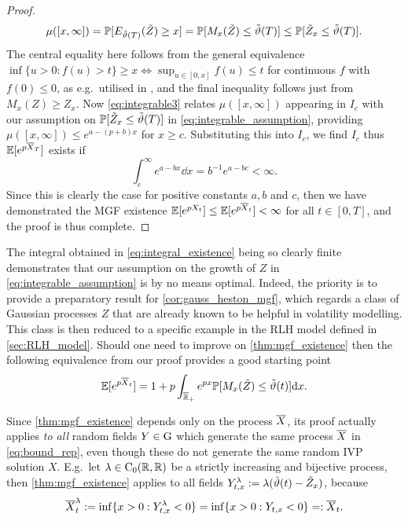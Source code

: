 \begin{proof}
    \begin{equation}\label{eq:integrable3}
        \mu([x,\infty]) = \mathbb{P}[ E_{\tilde{\vartheta}(T)}(\tilde{Z}) \ge x] = \mathbb{P}[M_x(\tilde{Z}) \le \tilde{\vartheta}(T)] \le \mathbb{P}[\tilde{Z}_x \le \tilde{\vartheta}(T)].
    \end{equation}
    The central equality here follows from the general equivalence $\inf\{u\!>\!0:f(u)\!>\!t\}\ge x\iff\sup_{u\in[0,x]}f(u)\le t$ for continuous $f$ with $f(0)\le0$, as e.g.~utilised in \cite{meerschaert_2004}, and the final inequality follows just from $M_x(Z)\ge Z_x$. Now \autoref{eq:integrable3} relates $\mu([x,\infty])$ appearing in $I_c$ with our assumption on $\mathbb{P}[\tilde{Z}_x \le \tilde{\vartheta}(T)]$ in \autoref{eq:integrable_assumption}, providing $\mu([x,\infty]) \le e^{a-(p+b)x}$ for $x\ge c$. Substituting this into $I_c$, we find $I_c$ thus $\mathbb{E}[e^{p{\overline{X}}_T}]$ exists if
    \begin{equation}\label{eq:integral_existence}
        \int_c^\infty e^{a - bx}\dd x = b^{-1}e^{a-bc} < \infty.
    \end{equation}
    Since this is clearly the case for positive constants $a,b$ and $c$, then we have demonstrated the MGF existence $\mathbb{E}[e^{p X_t}] \le \mathbb{E}[e^{p{\overline{X}}_t}]<\infty$ for all $t\in[0,T]$, and the proof is thus complete.
\end{proof}

The integral obtained in \autoref{eq:integral_existence} being so clearly finite demonstrates that our assumption on the growth of $Z$ in \autoref{eq:integrable_assumption} is by no means optimal. Indeed, the priority is to provide a preparatory result for \autoref{cor:gauss_heston_mgf}, which regards a class of Gaussian processes $Z$ that are already known to be helpful in volatility modelling. This class is then reduced to a specific example in the RLH model defined in \autoref{sec:RLH_model}. Should one need to improve on \autoref{thm:mgf_existence} then the following equivalence from our proof provides a good starting point
\begin{equation}
    \mathbb{E}[e^{p{\overline{X}}_t}] = 1 + p \int_{{\overline{\mathbb{R}}}_+}e^{px} \mathbb{P}[M_x(\tilde{Z}) \le \tilde{\vartheta}(t)] \mathrm{d} x.
\end{equation}

Since \autoref{thm:mgf_existence} depends only on the process ${\overline{X}}$, its proof actually applies \emph{to all} random fields $Y\in\mathrm{G}$ which generate the same process ${\overline{X}}$ in \autoref{eq:bound_rep}, even though these do not generate the same random IVP solution $X$. E.g.~let $\lambda\in\mathrm{C}_0(\mathbb{R},\mathbb{R})$ be a strictly increasing and bijective process, then \autoref{thm:mgf_existence} applies to all fields $Y^\lambda_{t,x}:=\lambda(\tilde{\vartheta}(t)-\tilde{Z}_x)$, because
\begin{equation}
    {\overline{X}}^\lambda_t := \inf\{x>0:Y^\lambda_{t,x}<0\} = \inf\{x>0:Y_{t,x}<0\} =: {\overline{X}}_t.
\end{equation}

